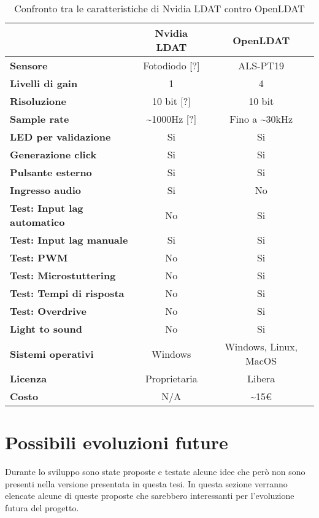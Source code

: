 \begin{table}[h!]
	\centering
	\begin{tabular}{|l|c|c|} 
		\hline
		& \textbf{Nvidia LDAT} & \textbf{OpenLDAT}  \\ 
		\hline
		\textbf{Sensore} & Fotodiodo [?] & ALS-PT19 \\
		\hline
		\textbf{Livelli di gain} & 1 & 4 \\
		\hline
		\textbf{Risoluzione} & 10 bit [?] & 10 bit \\
		\hline
		\textbf{Sample rate} & \textasciitilde 1000Hz [?] & Fino a \textasciitilde 30kHz \\
		\hline
		\textbf{LED per validazione} & Si & Si \\
		\hline
		\textbf{Generazione click} & Si & Si \\
		\hline
		\textbf{Pulsante esterno} & Si & Si \\
		\hline
		\textbf{Ingresso audio} & Si & No \\
		\hline
		\textbf{Test: Input lag automatico} & No & Si \\
		\hline
		\textbf{Test: Input lag manuale} & Si & Si \\
		\hline
		\textbf{Test: PWM} & No & Si \\
		\hline
		\textbf{Test: Microstuttering} & No & Si \\
		\hline
		\textbf{Test: Tempi di risposta} & No & Si \\
		\hline
		\textbf{Test: Overdrive} & No & Si \\
		\hline
		\textbf{Light to sound} & No & Si \\
		\hline
		\textbf{Sistemi operativi} & Windows & Windows, Linux, MacOS \\
		\hline
		\textbf{Licenza} & Proprietaria & Libera \\
		\hline
		\textbf{Costo} & N/A & \textasciitilde 15€ \\
		\hline
	\end{tabular}
	\caption{\label{tab:openldat_nvidialdat_comparison}Confronto tra le caratteristiche di Nvidia LDAT contro OpenLDAT}
\end{table}

\section{Possibili evoluzioni future}
Durante lo sviluppo sono state proposte e testate alcune idee che però non sono presenti nella versione presentata in questa tesi. In questa sezione verranno elencate alcune di queste proposte che sarebbero interessanti per l'evoluzione futura del progetto.

